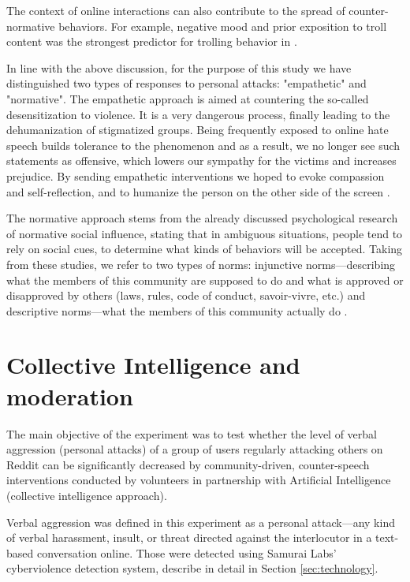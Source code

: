\documentclass[preprint,12pt]{elsarticle}
\begin{document}
The context of online interactions can also contribute to the spread of counter-normative behaviors. For example, negative mood and prior exposition to troll content was the strongest predictor for trolling behavior in \citep{cheng2017anyone}.


 
In line with the above discussion, for the purpose of this study we have distinguished two types of responses to personal attacks: "empathetic" and "normative". The empathetic approach is aimed at countering the so-called desensitization to violence. It is a very dangerous process, finally leading to the dehumanization of stigmatized groups.  
 Being frequently exposed to online hate speech builds tolerance to the phenomenon and as a result, we no longer see such statements as offensive, which lowers our sympathy for the victims and increases prejudice. By sending empathetic interventions we hoped to evoke compassion and self-reflection, and  to humanize the person on the other side of the screen \citep{bilewicz2021artificial}. 

The normative approach stems from the  already discussed psychological research of normative social influence, stating that in ambiguous situations, people tend to rely on social cues, to determine what kinds of behaviors will be accepted. Taking from these studies, we refer to two types of norms: injunctive norms---describing what the members of this community are supposed to do and what is approved or disapproved by others (laws, rules, code of conduct, savoir-vivre, etc.) and descriptive norms---what the members of this community actually do \citep{cialdini_focus_1991, cialdini2004social, cialdini2006managing}. 







\section{Collective Intelligence and  moderation}\label{collective-intelligence-approach-to-counter-speech}

The main objective of the experiment was to test whether the level of verbal aggression (personal attacks) of a group of users regularly attacking others on Reddit can be significantly decreased by community-driven, counter-speech interventions conducted by volunteers in partnership with Artificial Intelligence (collective intelligence approach).

Verbal aggression was defined in this experiment as a personal attack---any kind of verbal harassment, insult, or threat directed against the interlocutor in a text-based conversation online. Those were detected using Samurai Labs' cyberviolence detection system, describe in detail in Section \ref{sec:technology}.
\end{document}
